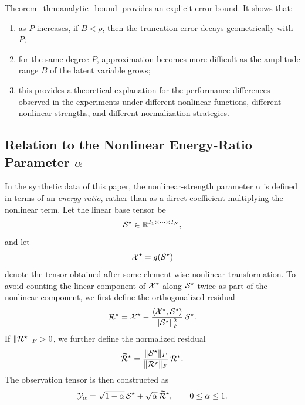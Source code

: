 \begin{remark}
Theorem~\ref{thm:analytic_bound} provides an explicit error bound. It shows that:
\begin{enumerate}
    \item as $P$ increases, if $B<\rho$, then the truncation error decays geometrically with $P$;
    \item for the same degree $P$, approximation becomes more difficult as the amplitude range $B$ of the latent variable grows;
    \item this provides a theoretical explanation for the performance differences observed in the experiments under different nonlinear functions, different nonlinear strengths, and different normalization strategies.
\end{enumerate}
\end{remark}

\subsection{\texorpdfstring{Relation to the Nonlinear Energy-Ratio Parameter $\alpha$}{Relation to the Nonlinear Energy-Ratio Parameter alpha}}
\label{app:alpha_energy_ratio}

In the synthetic data of this paper, the nonlinear-strength parameter $\alpha$ is defined in terms of an \emph{energy ratio}, rather than as a direct coefficient multiplying the nonlinear term. Let the linear base tensor be
\begin{equation}
\mathcal{S}^\star \in \mathbb{R}^{I_1\times\cdots\times I_N},
\end{equation}
and let
\begin{equation}
\mathcal{X}^\star = g(\mathcal{S}^\star)
\end{equation}
denote the tensor obtained after some element-wise nonlinear transformation. To avoid counting the linear component of $\mathcal{X}^\star$ along $\mathcal{S}^\star$ twice as part of the nonlinear component, we first define the orthogonalized residual
\begin{equation}
\mathcal{R}^\star
=
\mathcal{X}^\star
-
\frac{\langle \mathcal{X}^\star,\mathcal{S}^\star\rangle}{\|\mathcal{S}^\star\|_F^2}\,\mathcal{S}^\star.
\label{eq:orthogonal_residual_app}
\end{equation}
If $\|\mathcal{R}^\star\|_F>0$, we further define the normalized residual
\begin{equation}
\widetilde{\mathcal{R}}^\star
=
\frac{\|\mathcal{S}^\star\|_F}{\|\mathcal{R}^\star\|_F}\,\mathcal{R}^\star.
\label{eq:normalized_residual_app}
\end{equation}
The observation tensor is then constructed as
\begin{equation}
\mathcal{Y}_\alpha
=
\sqrt{1-\alpha}\,\mathcal{S}^\star
+
\sqrt{\alpha}\,\widetilde{\mathcal{R}}^\star,
\qquad
0\le \alpha\le 1.
\label{eq:alpha_energy_model_app}
\end{equation}

